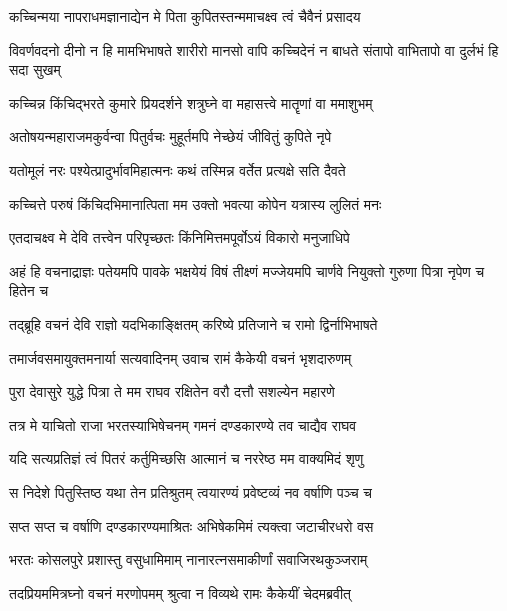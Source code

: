 \twolineshloka
{कच्चिन्मया नापराधमज्ञानाद्येन मे पिता}
{कुपितस्तन्ममाचक्ष्व त्वं चैवैनं प्रसादय} %

\threelineshloka
{विवर्णवदनो दीनो न हि मामभिभाषते}
{शारीरो मानसो वापि कच्चिदेनं न बाधते}
{संतापो वाभितापो वा दुर्लभं हि सदा सुखम्} %

\twolineshloka
{कच्चिन्न किंचिद्भरते कुमारे प्रियदर्शने}
{शत्रुघ्ने वा महासत्त्वे मातॄणां वा ममाशुभम्} %

\twolineshloka
{अतोषयन्महाराजमकुर्वन्वा पितुर्वचः}
{मुहूर्तमपि नेच्छेयं जीवितुं कुपिते नृपे} %

\twolineshloka
{यतोमूलं नरः पश्येत्प्रादुर्भावमिहात्मनः}
{कथं तस्मिन्न वर्तेत प्रत्यक्षे सति दैवते} %

\twolineshloka
{कच्चित्ते परुषं किंचिदभिमानात्पिता मम}
{उक्तो भवत्या कोपेन यत्रास्य लुलितं मनः} %

\twolineshloka
{एतदाचक्ष्व मे देवि तत्त्वेन परिपृच्छतः}
{किंनिमित्तमपूर्वोऽयं विकारो मनुजाधिपे} %

\threelineshloka
{अहं हि वचनाद्राज्ञः पतेयमपि पावके}
{भक्षयेयं विषं तीक्ष्णं मज्जेयमपि चार्णवे}
{नियुक्तो गुरुणा पित्रा नृपेण च हितेन च} %

\twolineshloka
{तद्ब्रूहि वचनं देवि राज्ञो यदभिकाङ्क्षितम्}
{करिष्ये प्रतिजाने च रामो द्विर्नाभिभाषते} %

\twolineshloka
{तमार्जवसमायुक्तमनार्या सत्यवादिनम्}
{उवाच रामं कैकेयी वचनं भृशदारुणम्} %

\twolineshloka
{पुरा देवासुरे युद्धे पित्रा ते मम राघव}
{रक्षितेन वरौ दत्तौ सशल्येन महारणे} %

\twolineshloka
{तत्र मे याचितो राजा भरतस्याभिषेचनम्}
{गमनं दण्डकारण्ये तव चाद्यैव राघव} %

\twolineshloka
{यदि सत्यप्रतिज्ञं त्वं पितरं कर्तुमिच्छसि}
{आत्मानं च नररेष्ठ मम वाक्यमिदं शृणु} %

\twolineshloka
{स निदेशे पितुस्तिष्ठ यथा तेन प्रतिश्रुतम्}
{त्वयारण्यं प्रवेष्टव्यं नव वर्षाणि पञ्च च} %

\twolineshloka
{सप्त सप्त च वर्षाणि दण्डकारण्यमाश्रितः}
{अभिषेकमिमं त्यक्त्वा जटाचीरधरो वस} %

\twolineshloka
{भरतः कोसलपुरे प्रशास्तु वसुधामिमाम्}
{नानारत्नसमाकीर्णां सवाजिरथकुञ्जराम्} %

\twolineshloka
{तदप्रियममित्रघ्नो वचनं मरणोपमम्}
{श्रुत्वा न विव्यथे रामः कैकेयीं चेदमब्रवीत्} %

